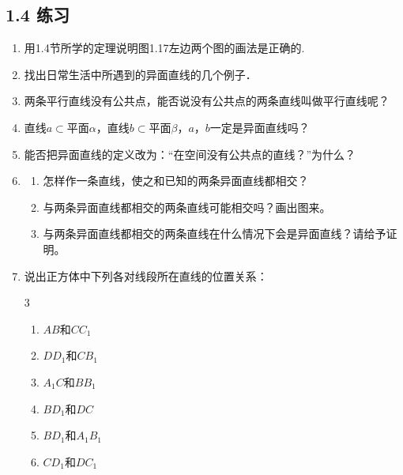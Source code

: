 \subsection*{1.4 练习}
\begin{enumerate}
\item 用1.4节所学的定理说明图1.17左边两个图的画法是正确的.
\item 找出日常生活中所遇到的异面直线的几个例子．
\item 两条平行直线没有公共点，能否说没有公共点的两条直线叫做平行直线呢？
\item 直线$a\subset$平面$\alpha$，直线$b\subset$平面$\beta$，$a$，$b$一定是异面直线吗？
\item 能否把异面直线的定义改为：“在空间没有公共点的直线？”为什么？
\item \begin{enumerate}[(1)]
    \item 怎样作一条直线，使之和已知的两条异面直线都相交？
    \item 与两条异面直线都相交的两条直线可能相交吗？画出图来。
    \item 与两条异面直线都相交的两条直线在什么情况下会是异面直线？请给予证明。
\end{enumerate}

\item 说出正方体中下列各对线段所在直线的位置关系：
\begin{multicols}{3}
\begin{enumerate}[(1)]
 \item $AB$和$CC_1$
\item $DD_1$和$CB_1$
\item $A_1C$和$BB_1$
\item $BD_1$和$DC$
\item $BD_1$和$A_1B_1$
\item $CD_1$和$DC_1$
\end{enumerate}
\end{multicols}

\noindent
\begin{minipage}{.45\textwidth}
    \centering
\end{minipage}
\end{enumerate}
